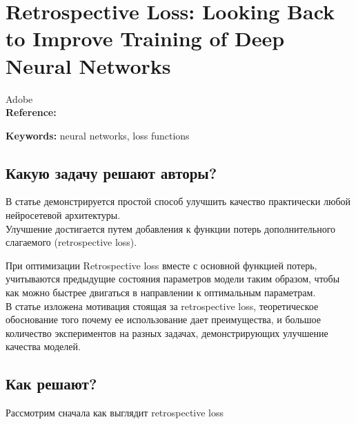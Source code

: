 \chapter{Retrospective Loss: Looking Back to Improve Training of Deep Neural Networks}

Adobe \\

\textbf{Reference:}~\cite{jandial2020retrospective}

\textbf{Keywords:} neural networks, loss functions

\section*{Какую задачу решают авторы?}

В статье демонстрируется простой способ улучшить качество практически любой нейросетевой архитектуры. \\

Улучшение достигается путем добавления к функции потерь дополнительного слагаемого (retrospective loss).

При оптимизации Retrospective loss вместе с основной функцией потерь, учитываются предыдущие состояния параметров модели таким образом, чтобы как можно быстрее двигаться в направлении к оптимальным параметрам. \\

В статье изложена мотивация стоящая за retrospective loss, теоретическое обоснование того почему ее использование дает преимущества, и большое количество экспериментов на разных задачах, демонстрирующих улучшение качества моделей. 

\section*{Как решают?}

Рассмотрим сначала как выглядит retrospective loss


